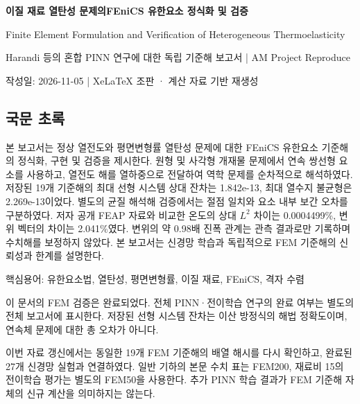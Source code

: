 \documentclass[10pt,a4paper]{article}
\begin{document}
{\LARGE\bfseries\sffamily\color{ink} 이질 재료 열탄성 문제의\newline FEniCS 유한요소 정식화 및 검증\par}\vspace{5mm}

{\small\color{muted} Finite Element Formulation and Verification of Heterogeneous Thermoelasticity\par}

{\small\color{muted} Harandi 등의 혼합 PINN 연구에 대한 독립 기준해 보고서 | AM Project Reproduce\par}

{\small\color{muted} 작성일: 2026-11-05 | XeLaTeX 조판 · 계산 자료 기반 재생성\par}

\subsection{국문 초록}

본 보고서는 정상 열전도와 평면변형률 열탄성 문제에 대한 FEniCS 유한요소 기준해의 정식화, 구현 및 검증을 제시한다. 원형 및 사각형 개재물 문제에서 연속 쌍선형 요소를 사용하고, 열전도 해를 열하중으로 전달하여 역학 문제를 순차적으로 해석하였다. 저장된 19개 기준해의 최대 선형 시스템 상대 잔차는 1.842e-13, 최대 열수지 불균형은 2.269e-13이었다. 별도의 균질 해석해 검증에서는 절점 일치와 요소 내부 보간 오차를 구분하였다. 저자 공개 FEAP 자료와 비교한 온도의 상대 $L^2$ 차이는 0.0004499\%, 변위 벡터의 차이는 2.041\%였다. 변위의 약 0.98배 진폭 관계는 관측 결과로만 기록하며 수치해를 보정하지 않았다. 본 보고서는 신경망 학습과 독립적으로 FEM 기준해의 신뢰성과 한계를 설명한다.\par

{\small\color{muted} 핵심용어: 유한요소법, 열탄성, 평면변형률, 이질 재료, FEniCS, 격자 수렴\par}

이 문서의 FEM 검증은 완료되었다. 전체 PINN·전이학습 연구의 완료 여부는 별도의 전체 보고서에 표시한다. 저장된 선형 시스템 잔차는 이산 방정식의 해법 정확도이며, 연속체 문제에 대한 총 오차가 아니다.\par

{\small\color{muted} 이번 자료 갱신에서는 동일한 19개 FEM 기준해의 배열 해시를 다시 확인하고, 완료된 27개 신경망 실험과 연결하였다. 일반 기하의 본문 수치 표는 FEM200, 재료비 15의 전이학습 평가는 별도의 FEM50을 사용한다. 추가 PINN 학습 결과가 FEM 기준해 자체의 신규 계산을 의미하지는 않는다.\par}
\end{document}
